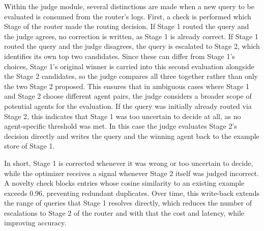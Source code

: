 Within the judge module, several distinctions are made when a new query to be evaluated is consumed from the router's logs. First, a check is performed which Stage of the router made the routing decision. If Stage 1 routed the query and the judge agrees, no correction is written, as Stage 1 is already correct. If Stage 1 routed the query and the judge disagrees, the query is escalated to Stage 2, which identifies its own top two candidates. Since these can differ from Stage 1's choices, Stage 1's original winner is carried into this second evaluation alongside the Stage 2 candidates, so the judge compares all three together rather than only the two Stage 2 proposed. This ensures that in ambiguous cases where Stage 1 and Stage 2 choose different agent pairs, the judge considers a broader scope of potential agents for the evaluation. If the query was initially already routed via Stage 2, this indicates that Stage 1 was too uncertain to decide at all, as no agent-specific threshold was met. In this case the judge evaluates Stage 2's decision directly and writes the query and the winning agent back to the example store of Stage 1.

In short, Stage 1 is corrected whenever it was wrong or too uncertain to decide, while the optimizer receives a signal whenever Stage 2 itself was judged incorrect. A novelty check blocks entries whose cosine similarity to an existing example exceeds 0.96, preventing redundant duplicates. Over time, this write-back extends the range of queries that Stage 1 resolves directly, which reduces the number of escalations to Stage 2 of the router and with that the cost and latency, while improving accuracy.
